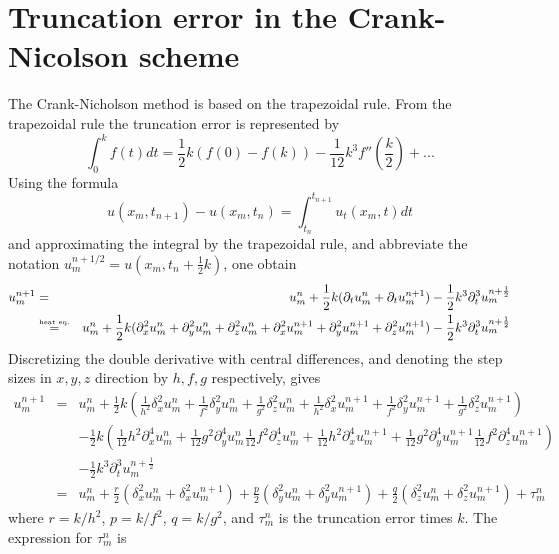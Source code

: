 \section{Truncation error in the Crank-Nicolson scheme}

The Crank-Nicholson method is based on the trapezoidal rule. From the trapezoidal rule the truncation error is represented by
\begin{equation*}
\int_0^k f(t) dt = \frac{1}{2} k (f(0) - f(k)) -\frac{1}{12} k^3 f''(\frac{k}{2}) + ...
\end{equation*}
Using the formula
\begin{equation*}
	u(x_m,t_{n+1}) - u(x_m,t_n) = \int_{t_n} ^{t_{n+1}} u_t(x_m,t) dt
\end{equation*}
and approximating the integral by the trapezoidal rule, and abbreviate the notation $u_m^{n+1/2} = u(x_m,t_n+\frac{1}{2} k)$, one obtain
\begin{eqnarray*}
u_m^ {n+1} &=& u_m^ n + \frac{1}{2} k(\partial_t u_m^n + \partial_t u_m^{n+1}) - \frac{1}{2} k^3 \partial_t ^3 u_m^{n+\frac{1}{2}} \\
		   &\stackrel{\text{\tiny heat eq.}}{=}&  u_m^ n + \frac{1}{2} k(\partial_x^2 u_m^n + \partial_y^2 u_m^n + \partial_z^2 u_m^n + \partial_x^2 u_m^{n+1} + \partial_y^2 u_m^{n+1} + \partial_z^2 u_m^{n+1}) - \frac{1}{2} k^3 \partial_t ^3 u_m^{n+\frac{1}{2}}
\end{eqnarray*}
Discretizing the double derivative with central differences, and denoting the step sizes in $x, y, z$ direction by $h, f, g$ respectively, gives
\begin{eqnarray*}
u_m^{n+1} &=&  u_m^ n + \frac{1}{2} k(\frac{1}{h^2}\delta_x^2 u_m^n + \frac{1}{f^2}\delta_y^2 u_m^n + \frac{1}{g^2}\delta_z^2 u_m^n + \frac{1}{h^2}\delta_x^2 u_m^{n+1} + \frac{1}{f^2}\delta_y^2 u_m^{n+1} + \frac{1}{g^2}\delta_z^2 u_m^{n+1}) \\
 		  &&- \frac{1}{2} k (\frac{1}{12}h^2\partial_x^4 u_m^n + \frac{1}{12}g^2\partial_y^4 u_m^n \frac{1}{12}f^2\partial_z^4 u_m^n + \frac{1}{12}h^2\partial_x^4 u_m^{n+1} + \frac{1}{12}g^2\partial_y^4 u_m^{n+1} \frac{1}{12}f^2\partial_z^4 u_m^{n+1} ) \\
 		  &&- \frac{1}{2} k^3 \partial_t ^3 u_m^{n+\frac{1}{2}} \\
 		  &=& u_m^n + \frac{r}{2}(\delta_x^2 u_m^n + \delta_x^2 u_m^{n+1}) + \frac{p}{2}(\delta_y^2 u_m^n + \delta_y^2 u_m^{n+1}) + \frac{q}{2}(\delta_z^2 u_m^n + \delta_z^2 u_m^{n+1}) + \tau_m^n
\end{eqnarray*}
where $r = k/h^2$, $p = k/f^2$, $q = k/g^2$, and $\tau_m^n$ is the truncation error times $k$. The expression for $\tau_m^n$ is
